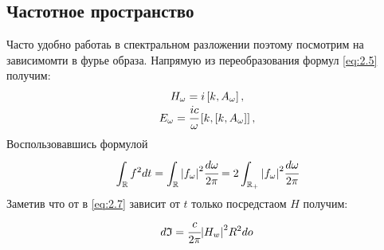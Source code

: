 \subsection{Частотное пространство}

Часто удобно работаь в спектральном разложении поэтому посмотрим 
на зависимомти в фурье образа. Напрямую из переобразования формул 
\ref{eq:2.5} получим:
\begin{gather}
    \begin{matrix}
        H_\omega = i \left[ k, A_\omega \right],\\
        E_\omega = \cfrac{ic}{\omega} \left[ k, \left[ k, A_\omega \right] \right],
    \end{matrix}
\end{gather}
Воспользовавшись формулой 
\begin{equation}
    \int_{\mathbb{R}} f^2 dt = \int_{\mathbb{R}} \abs{f_\omega}^2 \cfrac{d\omega}{2\pi} 
    = 2\int_{\mathbb{R}_+} \abs{f_\omega}^2 \cfrac{d\omega}{2\pi} 
\end{equation}
Заметив что от в \ref{eq:2.7}  зависит от $t$ только посредстаом $H$ 
получим:
\begin{equation}
    d\mathfrak{I} = \cfrac{c}{2\pi} \abs{H_w}^2R^2do
    \label{eq:if}
\end{equation}
